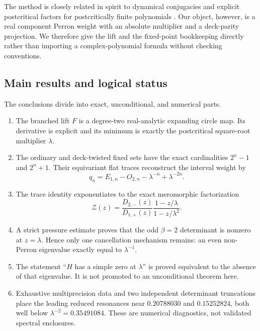 \documentclass[11pt]{article}
\theoremstyle{definition}
\theoremstyle{remark}
\newcommand{\cZ}{\mathcal Z}
\begin{document}
The method is closely related in spirit to dynamical conjugacies and explicit
postcritical factors for postcritically finite polynomials
\citep{BaladiJiangRugh2002}.  Our object, however, is a real component Perron
weight with an absolute multiplier and a deck-parity projection.  We
therefore give the lift and the fixed-point bookkeeping directly rather than
importing a complex-polynomial formula without checking conventions.

\subsection*{Main results and logical status}

The conclusions divide into exact, unconditional, and numerical parts.
\begin{enumerate}[label=\textbf{R\arabic*.},leftmargin=3.2em]
 \item The branched lift $F$ is a degree-two real-analytic expanding circle
 map.  Its derivative is explicit and its minimum is exactly the
 postcritical square-root multiplier $\lambda$.

 \item The ordinary and deck-twisted fixed sets have the exact cardinalities
 $2^n-1$ and $2^n+1$.  Their equivariant flat traces reconstruct the interval
 weight by
 \[
  q_n=E_{1,n}-O_{2,n}-\lambda^{-n}+\lambda^{-2n}.
 \]

 \item The trace identity exponentiates to the exact meromorphic
 factorization
 \[
  \cZ(z)=\frac{D_{2,-}(z)}{D_{1,+}(z)}
  \frac{1-z/\lambda}{1-z/\lambda^2}.
 \]

 \item A strict pressure estimate proves that the odd $\beta=2$ determinant
 is nonzero at $z=\lambda$.  Hence only one cancellation mechanism remains:
 an even non-Perron eigenvalue exactly equal to $\lambda^{-1}$.

 \item The statement ``$H$ has a simple zero at $\lambda$'' is proved
 equivalent to the absence of that eigenvalue.  It is not promoted to an
 unconditional theorem here.

 \item Exhaustive multiprecision data and two independent determinant
 truncations place the leading reduced resonances near $0.20788030$ and
 $0.15252824$, both well below $\lambda^{-2}=0.35491084$.  These are
 numerical diagnostics, not validated spectral enclosures.
\end{enumerate}
\end{document}
